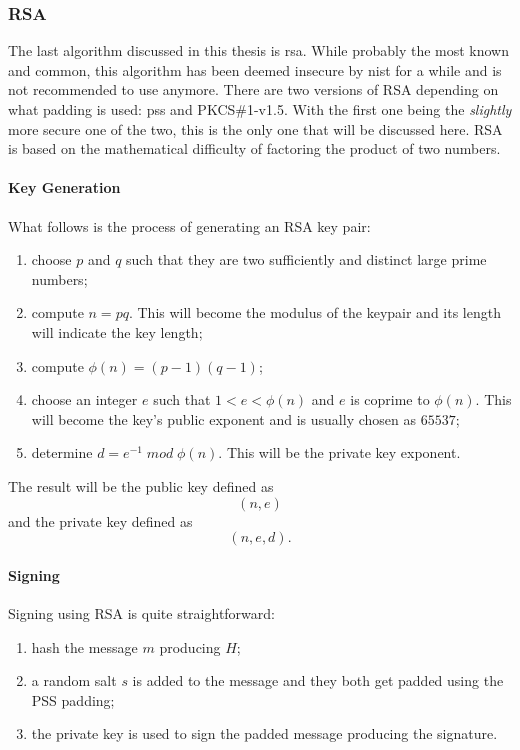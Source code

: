 \subsubsection{RSA}
The last algorithm discussed in this thesis is \gls{rsa}. While probably the most known and common, this algorithm has been deemed insecure by \gls{nist} for a while and is not recommended to use anymore. There are two versions of RSA depending on what padding is used: \gls{pss} and PKCS\#1-v1.5. With the first one being the \textit{slightly} more secure one of the two, this is the only one that will be discussed here. \cite{rfc8017-rsa} RSA is based on the mathematical difficulty of factoring the product of two numbers.

\paragraph{Key Generation}
What follows is the process of generating an RSA key pair:
\begin{enumerate}[itemsep=-0.1em,topsep=2mm]
    \item choose $p$ and $q$ such that they are two sufficiently and distinct large prime numbers;
    \item compute $n = pq$. This will become the modulus of the keypair and its length will indicate the key length;
    \item compute $\phi(n) = (p-1)(q-1)$;
    \item choose an integer $e$ such that $1 < e < \phi(n)$ and $e$ is coprime to $\phi(n)$. This will become the key's public exponent and is usually chosen as $65537$;
    \item determine $d = e^{-1} \; mod \; \phi(n)$. This will be the private key exponent.
\end{enumerate}
The result will be the public key defined as 
\[(n, e)\] 
and the private key defined as
\[(n, e, d).\]
\cite{rfc8017-rsa} \cite{rsa} \cite{crypto-encyclo}

\paragraph{Signing}
Signing using RSA is quite straightforward:
\begin{enumerate}[itemsep=-0.1em,topsep=2mm]
    \item hash the message $m$ producing $H$;
    \item a random \gls{salt} $s$ is added to the message and they both get padded using the PSS padding;
    \item the private key is used to sign the padded message producing the signature.
\end{enumerate}
\cite{crypto-encyclo} 

